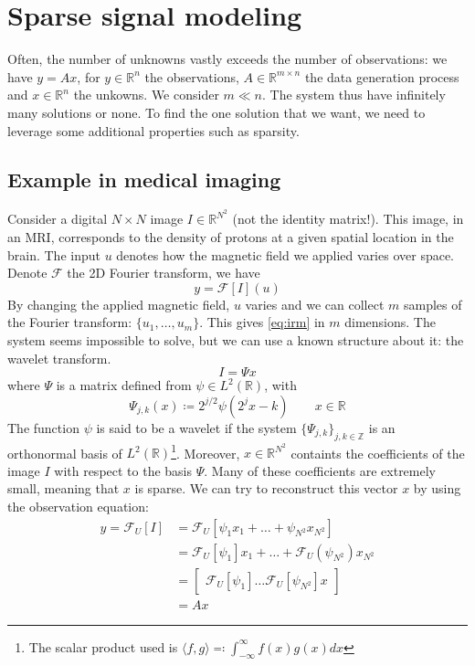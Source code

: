 \documentclass[12pt, openany]{report}
\newcommand{\R}{\mathbb{R}}
\newcommand{\Z}{\mathbb{Z}}
\theoremstyle{definition}
\begin{document}
\section{Sparse signal modeling}
Often, the number of unknowns vastly exceeds the number of observations: we have $y=Ax$, for $y\in \R^n$ the observations, $A\in \R^{m\times n}$ the data generation process and $x\in \R^n$ the unkowns. We consider $m\ll n$. The system thus have infinitely many solutions or none. To find the one solution that we want, we need to leverage some additional properties such as sparsity. \\
\subsection{Example in medical imaging}
Consider a digital $N\times N$ image $I\in \R^{N^2}$ (not the identity matrix!). This image, in an MRI, corresponds to the density of protons at a given spatial location in the brain. The input $u$ denotes how the magnetic field we applied varies over space. Denote $\mathcal{F}$ the 2D Fourier transform, we have
\begin{equation}\label{eq:irm}
	y = \mathcal{F}[I](u)
\end{equation}
By changing the applied magnetic field, $u$ varies and we can collect $m$ samples of the Fourier transform: $\{u_1,\dots,u_m\}$. This gives \eqref{eq:irm} in $m$ dimensions. The system seems impossible to solve, but we can use a known structure about it: the wavelet transform. 
\begin{equation}
	I = \Psi x
\end{equation}
where $\Psi$ is a matrix defined from $\psi\in L^2(\R)$, with 
\begin{equation}
	\Psi_{j,k}(x) \coloneqq 2^{j/2} \psi(2^jx-k)\qquad x\in \R
\end{equation}
The function $\psi$ is said to be a wavelet if the system $\{\Psi_{j,k}\}_{j,k\in \Z}$ is an orthonormal basis of $L^2(\R)$\footnote{The scalar product used is $\langle f,g\rangle \eqqcolon \int_{-\infty}^{\infty} f(x)g(x)dx$}. Moreover, $x\in \R^{N^2}$ containts the coefficients of the image $I$ with respect to the basis $\Psi$. Many of these coefficients are extremely small, meaning that $x$ is sparse. We can try to reconstruct this vector $x$ by using the observation equation:
\begin{equation}
	\begin{aligned}
		y = \mathcal{F}_U[I] &= \mathcal{F}_U\left[ \psi_1x_1+\dots + \psi_{N^2}x_{N^2}\right]\\
		&= \mathcal{F}_U[\psi_1]x_1 + \dots + \mathcal{F}_U(\psi_{N^2})x_{N^2}\\
		&= \begin{bmatrix} \mathcal{F}_U[\psi_1] \dots \mathcal{F}_U[\psi_{N^2}] x \end{bmatrix}\\
		&= Ax
	\end{aligned}
\end{equation}
\end{document}
